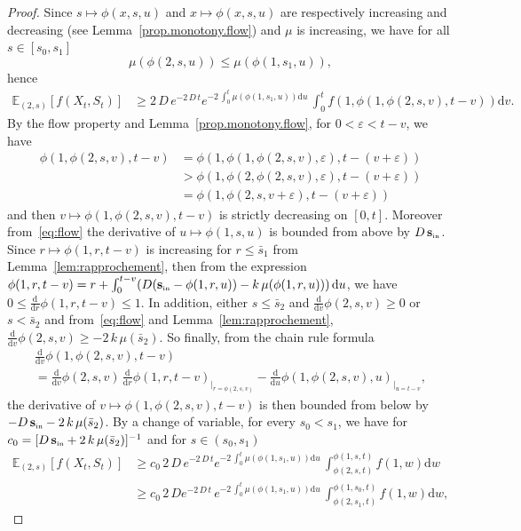 \documentclass[AHL,Unicode,longabstracts,published]{cedram}
\newcommand{\EE}{\mathbb{E}}
\newcommand{\Sin}{{\mathbf s}_{\textrm{\tiny\rm in}}}
\newcommand{\dif}{\mathrm{d}}
\newcommand{\1}{\mathbf{1}}
\begin{document}
\begin{proof}
Since $s\mapsto \phi(x,s,u)$ and $x\mapsto \phi(x,s,u)$ are respectively increasing and decreasing (see Lemma~\ref{prop.monotony.flow}) and $\mu$ is increasing, we have for all $s\in [s_0,s_1]$
\[
\mu (\phi(2,s,u)) \leq \mu (\phi(1,s_1,u)),
\]
hence
\begin{align*}
\EE_{(2,s)}\left[f(X_t,S_t)\right] &\geq 2\,D\, e^{-2\,D \,t} e^{ - 2\,\int_0^t \mu (\phi(1,s_1,u)) \dif u}\, \int_0^t f\left(1, \phi(1,\phi(2,s,v),t-v)\right) \dif v.
\end{align*}
By the flow property and Lemma~\ref{prop.monotony.flow}, for $0<\varepsilon < t-v$, we have
\begin{align*}
\phi(1,\phi(2,s,v),t-v) & =
\phi(1,\phi(1,\phi(2,s,v),\varepsilon),t-(v+\varepsilon))
\\
&>
\phi(1,\phi(2,\phi(2,s,v),\varepsilon),t-(v+\varepsilon))
\\
&= \phi(1,\phi(2,s,v+\varepsilon),t-(v+\varepsilon))
\end{align*}
and then $v\mapsto \phi(1,\phi(2,s,v),t-v)$ is strictly decreasing on $[0,t]$. Moreover from~\eqref{eq:flow} the derivative of $u\mapsto \phi(1,s,u)$ is bounded from above by $D\,\Sin$. Since $r\mapsto \phi(1,r,t-v)$ is increasing for $r\leq \bar s_1$ from Lemma~\ref{lem:rapprochement}, then from the expression $\phi(1,r,t-v) = r + \int_0^{t-v} (D(\Sin-\phi(1,r,u))-k\,\mu(\phi(1,r,u)))\,\dif u$, we have $0\leq\frac{\dif}{\dif r}\phi(1,r,t-v)\leq 1$. In addition, either $s\leq \bar s_2$ and $\frac{\dif}{\dif v}\phi(2,s,v)\geq 0$ or $s< \bar s_2$ and from~\eqref{eq:flow} and Lemma~\ref{lem:rapprochement}, $\frac{\dif}{\dif v}\phi(2,s,v)\geq -2\,k\,\mu(\bar s_2)$. So finally, from the chain rule formula
\begin{multline*}
\frac{\dif}{\dif v} \phi(1,\phi(2,s,v),t-v) \\= \frac{\dif}{\dif v}\phi(2,s,v)\,\frac{\dif}{\dif r} \phi(1,r,t-v)_{\vert_{r=\phi(2,s,v)}} - \frac{\dif}{\dif u} \phi(1,\phi(2,s,v),u)_{\vert_{u=t-v}},
\end{multline*}
the derivative of $v\mapsto \phi(1,\phi(2,s,v),t-v)$ is then bounded from below by $-D\,\Sin-2\,k\,\mu(\bar s_2)$. By a change of variable, for every $s_0<s_1$, we have for $c_0=[D\,\Sin+2\,k\,\mu(\bar s_2)]^{-1}$ and for $s\in (s_0,s_1)$
\begin{align*}
\EE_{(2,s)}\left[f(X_t,S_t)\right] &\geq c_{0} \,2\,D \, e^{-2\, D\, t} e^{ - 2\,\int_0^t \mu (\phi(1,s_1,u)) \dif u}\, \int_{\phi(2,s,t)}^{\phi(1,s,t)} f(1,w) \dif w \\
&\geq c_{0} \,2\, D e^{-2\, D\, t}\, e^{ - 2\,\int_0^t \mu (\phi(1,s_1,u)) \dif u} \,\int_{\phi(2,s_1,t)}^{\phi(1,s_0,t)} f(1,w) \dif w,

\end{align*}
\end{proof}
\end{document}

